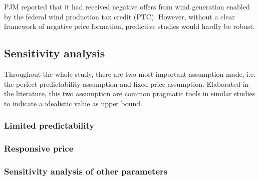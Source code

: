 PJM reported that it had received negative offers from wind generation enabled by the federal wind production tax credit (PTC)\cite{PJM_price_limit_1}. However, without a clear framework of negative price formation, predictive studies would hardly be robust. 

\subsection{Sensitivity analysis}
\label{sec:sensitivity}
Throughout the whole study, there are two most important assumption made, i.e. the perfect predictability assumption and fixed price assumption. Elaborated in the literature, this two assumption are common pragmatic tools in similar studies to indicate a idealistic value as upper bound. 

\subsubsection{Limited predictability}


\subsubsection{Responsive price}

\subsubsection{Sensitivity analysis of other parameters}





